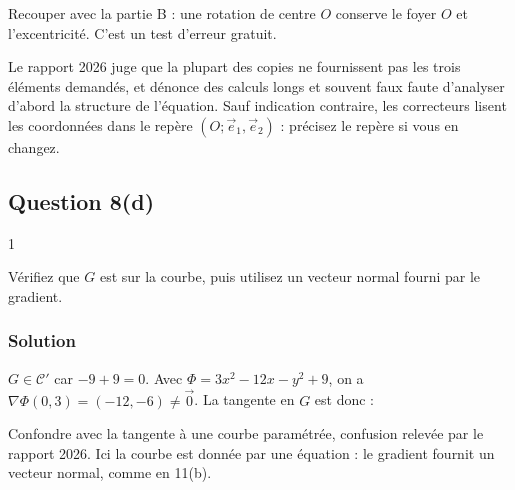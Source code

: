 \documentclass[11pt,a4paper]{article}
\newcommand{\equationajustee}[1]{%
  \sbox{\boiteequation}{$\displaystyle #1$}%
  \ifdim\wd\boiteequation>\linewidth
    \[\resizebox{\linewidth}{!}{\usebox{\boiteequation}}\]%
  \else
    \[#1\]%
  \fi}
\begin{document}
\begin{methode}

Recouper avec la partie B : une rotation de centre \(O\) conserve le foyer \(O\) et l'excentricité. C'est un test d'erreur gratuit.

\end{methode}

\begin{jury}

Le rapport 2026 juge que la plupart des copies ne fournissent pas les trois éléments demandés, et dénonce des calculs longs et souvent faux faute d'analyser d'abord la structure de l'équation. Sauf indication contraire, les correcteurs lisent les coordonnées dans le repère \((O;\vec e_1,\vec e_2)\) : précisez le repère si vous en changez.

\end{jury}

\hypertarget{question-8d}{%
\subsection{Question 8(d)}\label{question-8d}}

\begin{indication}{1}

Vérifiez que \(G\) est sur la courbe, puis utilisez un vecteur normal fourni par le gradient.

\end{indication}

\hypertarget{solution-28}{%
\subsubsection{Solution}\label{solution-28}}

\(G\in\mathcal{C}'\) car \(-9+9=0\). Avec \(\Phi=3x^2-12x-y^2+9\), on a \(\nabla\Phi(0,3)=(-12,-6)\neq\vec0\). La tangente en \(G\) est donc :

\equationajustee{\begin{aligned}{}&-12x-6(y-3)=0\\
\iff\ &2x+y-3=0.
\end{aligned}}

\equationajustee{\boxed{\mathcal{T}:\ 2x+y=3.}}

\begin{piege}

Confondre avec la tangente à une courbe paramétrée, confusion relevée par le rapport 2026. Ici la courbe est donnée par une équation : le gradient fournit un vecteur normal, comme en 11(b).

\end{piege}
\end{document}
